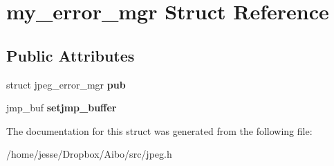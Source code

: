 \hypertarget{structmy__error__mgr}{
\section{my\_\-error\_\-mgr Struct Reference}
\label{structmy__error__mgr}
}
\subsection*{Public Attributes}
\begin{DoxyCompactItemize}
\item 
\hypertarget{structmy__error__mgr_aac1fb61cc51b4d8edbb44ba85fcccdb4}{
struct jpeg\_\-error\_\-mgr {\bfseries pub}}
\label{structmy__error__mgr_aac1fb61cc51b4d8edbb44ba85fcccdb4}

\item 
\hypertarget{structmy__error__mgr_a751138dd0c774fe1d41bb5465b3a7539}{
jmp\_\-buf {\bfseries setjmp\_\-buffer}}
\label{structmy__error__mgr_a751138dd0c774fe1d41bb5465b3a7539}

\end{DoxyCompactItemize}


The documentation for this struct was generated from the following file:\begin{DoxyCompactItemize}
\item 
/home/jesse/Dropbox/Aibo/src/jpeg.h\end{DoxyCompactItemize}
